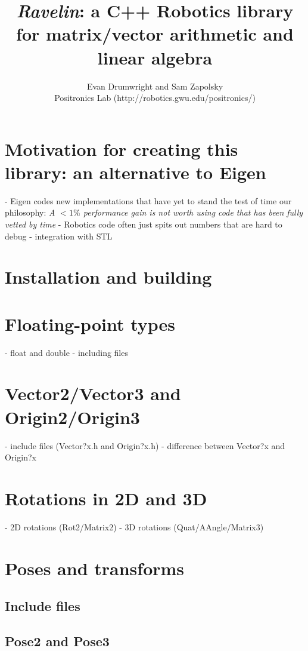 \documentclass[11pt, letterpaper]{article}
\begin{document}
\singlespacing
\noindent

\title{\emph{Ravelin}: a C++ Robotics library for matrix/vector arithmetic and linear algebra}
\author{Evan Drumwright and Sam Zapolsky\\Positronics Lab (http://robotics.gwu.edu/positronics/)}
\newline
\noindent

\section{Motivation for creating this library: an alternative to Eigen}
- Eigen codes new implementations that have yet to stand the test of time
  our philosophy: \emph{A $< 1\%$ performance gain is not worth using
  code that has been fully vetted by time}
- Robotics code often just spits out numbers that are hard to debug
- integration with STL

\section{Installation and building}

\section{Floating-point types}
- float and double
- including files

\section{Vector2/Vector3 and Origin2/Origin3}
- include files (Vector?x.h and Origin?x.h)
- difference between Vector?x and Origin?x

\section{Rotations in 2D and 3D}
- 2D rotations (Rot2/Matrix2)
- 3D rotations (Quat/AAngle/Matrix3)

\section{Poses and transforms}

\subsection{Include files}

\subsection{Pose2 and Pose3}
\end{document}
